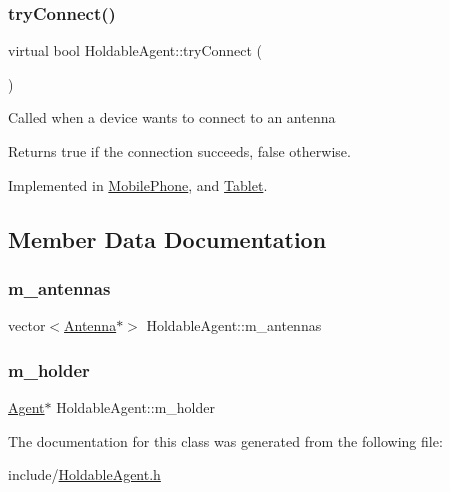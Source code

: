 \subsubsection{\texorpdfstring{tryConnect()}{tryConnect()}}
{\footnotesize\ttfamily virtual bool Holdable\+Agent\+::try\+Connect (\begin{DoxyParamCaption}{ }\end{DoxyParamCaption})\hspace{0.3cm}{\ttfamily [pure virtual]}}

Called when a device wants to connect to an antenna \begin{DoxyReturn}{Returns}
true if the connection succeeds, false otherwise. 
\end{DoxyReturn}


Implemented in \mbox{\hyperlink{class_mobile_phone_ad91afa811cea8ee124167f5941bcda1b}{Mobile\+Phone}}, and \mbox{\hyperlink{class_tablet_a2328422e1706dfeb2b51a6960e6879f0}{Tablet}}.



\subsection{Member Data Documentation}
\mbox{\label{class_holdable_agent_a5f104212204e4c6761bed1d61fab100b}} 
\subsubsection{\texorpdfstring{m\_antennas}{m\_antennas}}
{\footnotesize\ttfamily vector$<$\mbox{\hyperlink{class_antenna}{Antenna}}$\ast$$>$ Holdable\+Agent\+::m\+\_\+antennas\hspace{0.3cm}{\ttfamily [private]}}

\mbox{\label{class_holdable_agent_ae9c449c1831f933b5b6b6f71e425279b}} 
\subsubsection{\texorpdfstring{m\_holder}{m\_holder}}
{\footnotesize\ttfamily \mbox{\hyperlink{class_agent}{Agent}}$\ast$ Holdable\+Agent\+::m\+\_\+holder\hspace{0.3cm}{\ttfamily [private]}}



The documentation for this class was generated from the following file\+:\begin{DoxyCompactItemize}
\item 
include/\mbox{\hyperlink{_holdable_agent_8h}{Holdable\+Agent.\+h}}\end{DoxyCompactItemize}

